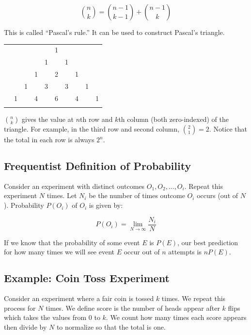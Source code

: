 \documentclass[12pt, a4paper]{article}
\newcounter{exa}
\begin{document}
$$\binom{n}{k} = \binom{n-1}{k-1} + \binom{n-1}{k}$$

This is called ``Pascal's rule.'' It can be used to construct Pascal's triangle.

\begin{center}
\begin{tabular}{rccccccccc}
&    &    &    &    &  1\\\noalign{\smallskip\smallskip}
&    &    &    &  1 &    &  1\\\noalign{\smallskip\smallskip}
&    &    &  1 &    &  2 &    &  1\\\noalign{\smallskip\smallskip}
&    &  1 &    &  3 &    &  3 &    &  1\\\noalign{\smallskip\smallskip}
&  1 &    &  4 &    &  6 &    &  4 &    &  1\\\noalign{\smallskip\smallskip}
\end{tabular}
\end{center}

$\binom{n}{k}$ gives the value at $n$th row and $k$th column (both zero-indexed) of the triangle. For example, in the third row and second column, $\binom{2}{1}=2$. Notice that the total in each row is always $2^n$.

\subsection{Frequentist Definition of Probability}

Consider an experiment with distinct outcomes $O_1, O_2, \dots, O_i$. Repeat this experiment $N$ times. Let $N_i$ be the number of times outcome $O_i$ occurs (out of $N$). Probability $P(O_i)$ of $O_i$ is given by:

$$P(O_i) = \lim_{N \to \infty} \frac{N_i}{N}$$

If we know that the probability of some event $E$ is $P(E)$, our best prediction for how many times we will see event $E$ occur out of $n$ attempts is $nP(E)$.

\subsection{Example: Coin Toss Experiment}

Consider an experiment where a fair coin is tossed $k$ times. We repeat this process for $N$ times. We define score is the number of heads appear after $k$ flips which takes the values from $0$ to $k$. We count how many times each score appears then divide by $N$ to normalize so that the total is one. \\
\end{document}
